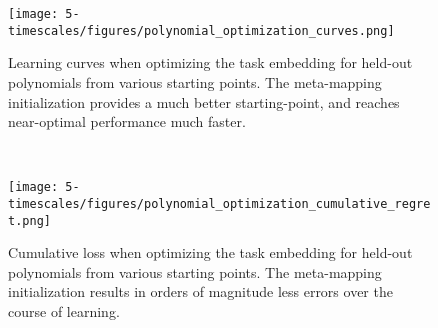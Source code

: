 \begin{figure}
\centering
\texttt{[image: 5-timescales/figures/polynomial\_optimization\_curves.png]}
\caption{Learning curves when optimizing the task embedding for held-out polynomials from various starting points. The meta-mapping initialization provides a much better starting-point, and reaches near-optimal performance much faster.} \label{fig:timescales_polynomial_optimization_curves}
\end{figure}
~
\begin{figure}
\centering
\texttt{[image: 5-timescales/figures/polynomial\_optimization\_cumulative\_regret.png]}
\caption{Cumulative loss when optimizing the task embedding for held-out polynomials from various starting points. The meta-mapping initialization results in orders of magnitude less errors over the course of learning.} \label{fig:timescales_polynomial_optimization_regret}
\end{figure}

